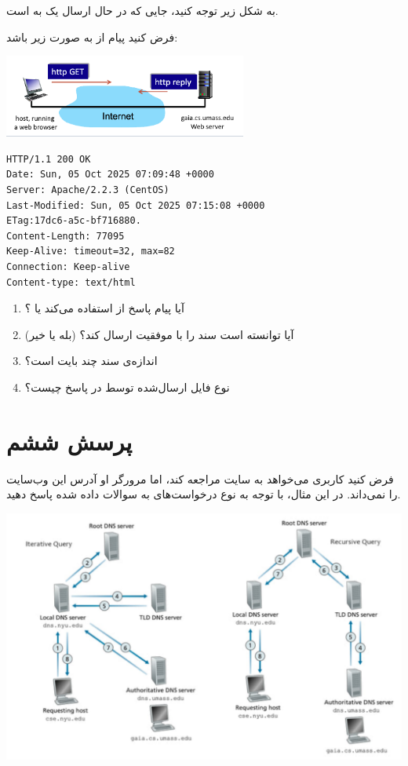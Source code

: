 به شکل زیر توجه کنید، جایی که  در حال ارسال یک  به  است.  


فرض کنید پیام  از  به صورت زیر باشد:
\begin{center}
\includegraphics[width=0.6\textwidth]{images/images5.png}
\end{center} 






\begin{verbatim}
HTTP/1.1 200 OK
Date: Sun, 05 Oct 2025 07:09:48 +0000
Server: Apache/2.2.3 (CentOS)
Last-Modified: Sun, 05 Oct 2025 07:15:08 +0000
ETag:17dc6-a5c-bf716880.
Content-Length: 77095
Keep-Alive: timeout=32, max=82
Connection: Keep-alive
Content-type: text/html
\end{verbatim}

\begin{enumerate}[label=\alph*)]
\item آیا پیام پاسخ از  استفاده می‌کند یا ؟
\item آیا  توانسته است سند را با موفقیت ارسال کند؟ (بله یا خیر)
\item اندازه‌ی سند چند بایت است؟
\item نوع فایل ارسال‌شده توسط  در پاسخ چیست؟
\end{enumerate}

\section*{پرسش ششم}

فرض کنید کاربری می‌خواهد به سایت  مراجعه کند، اما مرورگر او آدرس  این وب‌سایت را نمی‌داند. در این مثال، با توجه به نوع درخواست‌های  به سوالات داده شده پاسخ دهید.

\begin{center}
\includegraphics[width=0.8\linewidth]{images/screenshot002}
\end{center}

